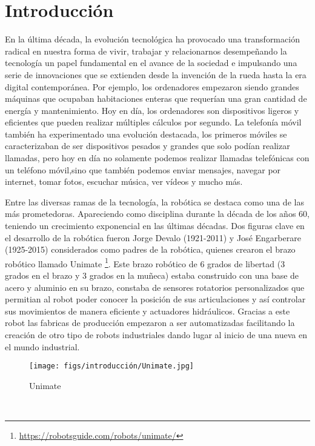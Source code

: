 \chapter{Introducción}
\label{cap:introduccion}
\setcounter{page}{1}

En la última década, la evolución tecnológica ha provocado una transformación radical en nuestra forma de vivir, trabajar y relacionarnos desempeñando la tecnología un papel 
fundamental en el avance de la sociedad e impulsando una serie de innovaciones que se extienden desde la invención de la rueda hasta la era digital contemporánea. 
Por ejemplo, los ordenadores empezaron siendo grandes máquinas que ocupaban habitaciones enteras que requerían una gran cantidad de energía y mantenimiento. Hoy en día, los ordenadores
son dispositivos ligeros y eficientes que pueden realizar múltiples cálculos por segundo. La telefonía móvil también ha experimentado una evolución destacada, los primeros móviles
se caracterizaban de ser dispositivos pesados y grandes que solo podían realizar llamadas, pero hoy en día no solamente podemos realizar llamadas telefónicas con un teléfono móvil,sino 
que también podemos enviar mensajes, navegar por internet, tomar fotos, escuchar música, ver vídeos y mucho más. \newline

Entre las diversas ramas de la tecnología, la robótica se destaca como una de las más prometedoras. Apareciendo como disciplina durante la década de los años 60, teniendo un crecimiento exponencial en las últimas décadas. Dos figuras clave en el desarrollo de la robótica fueron Jorge Devalo (1921-2011) y 
José Engarberare (1925-2015) considerados como padres de la robótica, quienes crearon el brazo robótico llamado Unimate \footnote{\url{https://robotsguide.com/robots/unimate/}}. 
Este brazo robótico de 6 grados de libertad (3 grados en el brazo y 3 grados en la muñeca) estaba construido con una base de acero y aluminio en su brazo, 
constaba de sensores rotatorios personalizados que permitian al robot poder conocer la posición de sus articulaciones y así controlar
sus movimientos de manera eficiente y actuadores hidráulicos. Gracias a este robot las fabricas de producción empezaron a ser automatizadas facilitando la creación 
de otro tipo de robots industriales dando lugar al inicio de una nueva en el mundo industrial.

\begin{figure} [H]
  \begin{center}
    \texttt{[image: figs/introducción/Unimate.jpg]}
  \end{center}
  \caption{Unimate}
  \label{fig:unimate}
\end{figure}\
\newline 
\newline 

